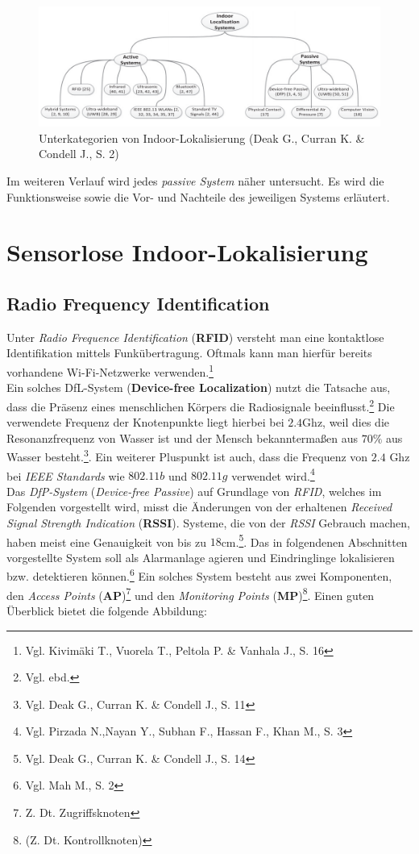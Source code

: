 \begin{figure}[H]
	\centering
	\includegraphics[scale=0.9]{pictures/indoor_loc}
	\caption{Unterkategorien von Indoor-Lokalisierung (Deak G.,  Curran K. \& Condell J., S. 2)}
\end{figure}

Im weiteren Verlauf wird jedes \textit{passive System} näher untersucht. Es wird die Funktionsweise sowie die Vor- und Nachteile des jeweiligen Systems erläutert.


\section{Sensorlose Indoor-Lokalisierung}
\subsection{Radio Frequency Identification}
Unter \textit{Radio Frequence Identification} (\textbf{RFID}) versteht man eine kontaktlose Identifikation mittels Funkübertragung. Oftmals kann man hierfür bereits vorhandene Wi-Fi-Netzwerke verwenden.\footnote{Vgl. Kivimäki T., Vuorela T., Peltola P. \& Vanhala J., S.  16} \\
Ein solches DfL-System (\textbf{Device-free Localization}) nutzt die Tatsache aus, dass die Präsenz eines menschlichen Körpers die Radiosignale beeinflusst.\footnote{Vgl. ebd.} Die verwendete Frequenz der Knotenpunkte liegt hierbei bei $2.4$Ghz, weil dies die Resonanzfrequenz von Wasser ist und der Mensch bekanntermaßen aus $70\%$ aus Wasser besteht.\footnote{Vgl. Deak G.,  Curran K. \& Condell J., S. 11}. Ein weiterer Pluspunkt ist auch, dass die Frequenz von $2.4$ Ghz bei \textit{IEEE Standards} wie $802.11b$ und $802.11g$ verwendet wird.\footnote{Vgl. Pirzada N.,Nayan Y., Subhan F., Hassan F., Khan M., S. 3}\\
Das \textit{DfP-System} (\textit{Device-free Passive}) auf Grundlage von \textit{RFID}, welches im Folgenden vorgestellt wird, misst die Änderungen von der erhaltenen \textit{Received Signal Strength Indication} (\textbf{RSSI}). Systeme, die von der \textit{RSSI} Gebrauch machen, haben meist eine Genauigkeit von bis zu $18$cm.\footnote{Vgl. Deak G.,  Curran K. \& Condell J., S. 14}. Das in folgendenen Abschnitten vorgestellte System soll als Alarmanlage agieren und Eindringlinge lokalisieren bzw. detektieren können.\footnote{Vgl. Mah M., S. 2} Ein solches System besteht aus zwei Komponenten, den \textit{Access Points} (\textbf{AP})\footnote{Z. Dt. Zugriffsknoten} und den \textit{Monitoring Points} (\textbf{MP})\footnote{(Z. Dt. Kontrollknoten)}. Einen guten Überblick bietet die folgende Abbildung:\\

